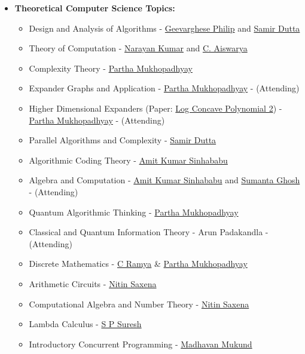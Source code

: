 \documentclass[10pt,a4paper,sans,colorlinks]{moderncv}        %
\begin{document}
\begin{itemize}
\begin{itemize}
\item \textbf{Theoretical Computer Science Topics:} \begin{itemize}
\item Design and Analysis of Algorithms - \href{https://www.cmi.ac.in/~gphilip/}{Geevarghese Philip} and \href{https://www.cmi.ac.in/~sdatta/}{Samir Dutta}
\item Theory of Computation - \href{https://www.cmi.ac.in/~kumar/}{Narayan Kumar} and \href{https://www.cmi.ac.in/~aiswarya/}{C. Aiswarya}
\item Complexity Theory - \href{https://www.cmi.ac.in/~partham/}{Partha Mukhopadhyay}
\item Expander Graphs and Application - \href{https://www.cmi.ac.in/~partham/}{Partha Mukhopadhyay} - (Attending)
\item Higher Dimensional Expanders (Paper: \href{https://arxiv.org/abs/1811.01816}{Log Concave Polynomial 2}) - \href{https://www.cmi.ac.in/~partham/}{Partha Mukhopadhyay} - (Attending)
\item Parallel Algorithms and Complexity - \href{https://www.cmi.ac.in/~sdatta/}{Samir Dutta}
\item Algorithmic Coding Theory - \href{https://www.cmi.ac.in/people/fac-profile.php?id=amitks}{Amit Kumar Sinhababu}
\item Algebra and Computation - \href{https://www.cmi.ac.in/people/fac-profile.php?id=amitks}{Amit Kumar Sinhababu} and \href{https://sites.google.com/view/sumghosh/home}{Sumanta Ghosh} - (Attending)
\item Quantum Algorithmic Thinking - \href{https://www.cmi.ac.in/~partham/}{Partha Mukhopadhyay}
\item Classical and Quantum Information Theory - Arun Padakandla - (Attending)
\item Discrete Mathematics - \href{https://sites.google.com/cse.iitm.ac.in/c-ramya}{C Ramya} \& \href{https://www.cmi.ac.in/~partham/}{Partha Mukhopadhyay}
\item Arithmetic Circuits - \href{https://www.cse.iitk.ac.in/users/nitin/}{Nitin Saxena}
\item Computational Algebra and Number Theory - \href{https://www.cse.iitk.ac.in/users/nitin/}{Nitin Saxena}
\item Lambda Calculus - \href{https://www.cmi.ac.in/~spsuresh/}{S P Suresh}
\item Introductory Concurrent Programming - \href{https://www.cmi.ac.in/~madhavan/}{Madhavan Mukund}
		            \end{itemize}

\end{itemize}
\end{itemize}
\end{document}
